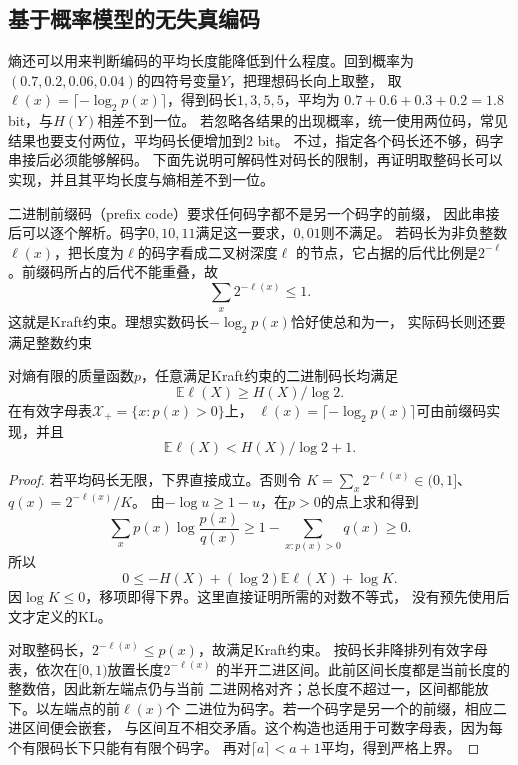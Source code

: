 \subsection{基于概率模型的无失真编码}
\label{sec:information-lossless-coding}

熵还可以用来判断编码的平均长度能降低到什么程度。回到概率为\((0.7,0.2,0.06,0.04)\)的四符号变量\(Y\)，把理想码长向上取整，
取\(\ell(x)=\lceil-\log_2p(x)\rceil\)，得到码长\(1,3,5,5\)，平均为
\(0.7+0.6+0.3+0.2=1.8\) bit，与\(H(Y)\)相差不到一位。
若忽略各结果的出现概率，统一使用两位码，常见结果也要支付两位，平均码长便增加到\(2\) bit。
不过，指定各个码长还不够，码字串接后必须能够解码。
下面先说明可解码性对码长的限制，再证明取整码长可以实现，并且其平均长度与熵相差不到一位。

二进制前缀码（prefix code）要求任何码字都不是另一个码字的前缀，
因此串接后可以逐个解析。码字\(0,10,11\)满足这一要求，\(0,01\)则不满足。
若码长为非负整数\(\ell(x)\)，把长度为\(\ell\)的码字看成二叉树深度\(\ell\)
的节点，它占据的后代比例是\(2^{-\ell}\)。前缀码所占的后代不能重叠，故
\[
  \sum_x2^{-\ell(x)}\leq1.
\]
这就是Kraft约束。理想实数码长\(-\log_2p(x)\)恰好使总和为一，
实际码长则还要满足整数约束

\begin{theorem}[无失真前缀码的平均长度界]
\label{thm:information-source-coding-bound}
对熵有限的质量函数\(p\)，任意满足Kraft约束的二进制码长均满足
\[
  \mathbb E\ell(X)\geq H(X)/\log2.
\]
在有效字母表\(\mathcal X_+=\{x:p(x)>0\}\)上，
\(\ell(x)=\lceil-\log_2p(x)\rceil\)可由前缀码实现，并且
\[
  \mathbb E\ell(X)<H(X)/\log2+1.
\]
\end{theorem}
\begin{proof}
若平均码长无限，下界直接成立。否则令
\(K=\sum_x2^{-\ell(x)}\in(0,1]\)、\(q(x)=2^{-\ell(x)}/K\)。
由\(-\log u\geq1-u\)，在\(p>0\)的点上求和得到
\[
  \sum_xp(x)\log\frac{p(x)}{q(x)}
  \geq1-\sum_{x:p(x)>0}q(x)\geq0.
\]
所以
\[
  0\leq-H(X)+(\log2)\mathbb E\ell(X)+\log K.
\]
因\(\log K\leq0\)，移项即得下界。这里直接证明所需的对数不等式，
没有预先使用后文才定义的KL。

对取整码长，\(2^{-\ell(x)}\leq p(x)\)，故满足Kraft约束。
按码长非降排列有效字母表，依次在\([0,1)\)放置长度\(2^{-\ell(x)}\)
的半开二进区间。此前区间长度都是当前长度的整数倍，因此新左端点仍与当前
二进网格对齐；总长度不超过一，区间都能放下。以左端点的前\(\ell(x)\)个
二进位为码字。若一个码字是另一个的前缀，相应二进区间便会嵌套，
与区间互不相交矛盾。这个构造也适用于可数字母表，因为每个有限码长下只能有有限个码字。
再对\(\lceil a\rceil<a+1\)平均，得到严格上界。
\end{proof}

